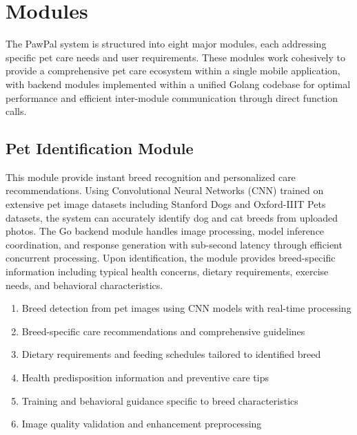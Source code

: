 \section{Modules}

The PawPal system is structured into eight major modules, each addressing specific pet care needs and user requirements. These modules work cohesively to provide a comprehensive pet care ecosystem within a single mobile application, with backend modules implemented within a unified Golang codebase for optimal performance and efficient inter-module communication through direct function calls.

\subsection{Pet Identification Module}
This module provide instant breed recognition and personalized care recommendations. Using Convolutional Neural Networks (CNN) trained on extensive pet image datasets including Stanford Dogs and Oxford-IIIT Pets datasets, the system can accurately identify dog and cat breeds from uploaded photos. The Go backend module handles image processing, model inference coordination, and response generation with sub-second latency through efficient concurrent processing. Upon identification, the module provides breed-specific information including typical health concerns, dietary requirements, exercise needs, and behavioral characteristics.
\begin{enumerate}
    \item  Breed detection from pet images using CNN models with real-time processing
    \item Breed-specific care recommendations and comprehensive guidelines
    \item Dietary requirements and feeding schedules tailored to identified breed
    \item Health predisposition information and preventive care tips
    \item Training and behavioral guidance specific to breed characteristics
    \item Image quality validation and enhancement preprocessing
\end{enumerate}

